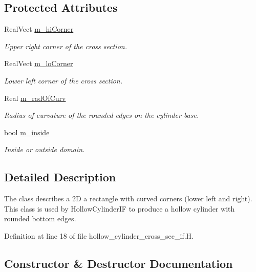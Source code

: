 \subsection*{Protected Attributes}
\begin{DoxyCompactItemize}
\item 
Real\+Vect \hyperlink{classhollow__cylinder__cross__sec__if_ad8cda4b5de6b4cf6759769a688f72473}{m\+\_\+hi\+Corner}
\begin{DoxyCompactList}\small\item\em Upper right corner of the cross section. \end{DoxyCompactList}\item 
Real\+Vect \hyperlink{classhollow__cylinder__cross__sec__if_a7b1dc3ee2b9591d48a83d7a83435d742}{m\+\_\+lo\+Corner}
\begin{DoxyCompactList}\small\item\em Lower left corner of the cross section. \end{DoxyCompactList}\item 
Real \hyperlink{classhollow__cylinder__cross__sec__if_afe1e4c0fcec88ded0114b68ba91f7580}{m\+\_\+rad\+Of\+Curv}
\begin{DoxyCompactList}\small\item\em Radius of curvature of the rounded edges on the cylinder base. \end{DoxyCompactList}\item 
bool \hyperlink{classhollow__cylinder__cross__sec__if_aaa2a47d30acdc5f7f386e206100fa2b8}{m\+\_\+inside}
\begin{DoxyCompactList}\small\item\em Inside or outside domain. \end{DoxyCompactList}\end{DoxyCompactItemize}


\subsection{Detailed Description}
The class describes a 2D a rectangle with curved corners (lower left and right). This class is used by Hollow\+Cylinder\+IF to produce a hollow cylinder with rounded bottom edges. 

Definition at line 18 of file hollow\+\_\+cylinder\+\_\+cross\+\_\+sec\+\_\+if.\+H.



\subsection{Constructor \& Destructor Documentation}
